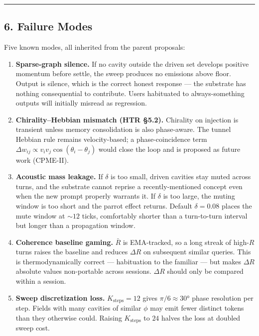 \documentclass[
  11pt,
  a4paper,
]{article}
\begin{document}
\begin{center}\rule{0.5\linewidth}{0.5pt}\end{center}

\subsection{6. Failure Modes}\label{failure-modes}

Five known modes, all inherited from the parent proposals:

\begin{enumerate}
\def\labelenumi{\arabic{enumi}.}
\item
  \textbf{Sparse-graph silence.} If no cavity outside the driven set
  develops positive momentum before settle, the sweep produces no
  emissions above floor. Output is silence, which is the correct honest
  response --- the substrate has nothing consequential to contribute.
  Users habituated to always-something outputs will initially misread as
  regression.
\item
  \textbf{Chirality--Hebbian mismatch (HTR §5.2).} Chirality on
  injection is transient unless memory consolidation is also
  phase-aware. The tunnel Hebbian rule remains velocity-based; a
  phase-coincidence term
  \(\Delta w_{ij} \propto v_i v_j \cos(\theta_i - \theta_j)\) would
  close the loop and is proposed as future work (CPME-II).
\item
  \textbf{Acoustic mass leakage.} If \(\delta\) is too small, driven
  cavities stay muted across turns, and the substrate cannot reprise a
  recently-mentioned concept even when the new prompt properly warrants
  it. If \(\delta\) is too large, the muting window is too short and the
  parrot effect returns. Default \(\delta = 0.08\) places the mute
  window at \(\sim 12\) ticks, comfortably shorter than a turn-to-turn
  interval but longer than a propagation window.
\item
  \textbf{Coherence baseline gaming.} \(\bar R\) is EMA-tracked, so a
  long streak of high-\(R\) turns raises the baseline and reduces
  \(\Delta R\) on subsequent similar queries. This is thermodynamically
  correct --- habituation to the familiar --- but makes \(\Delta R\)
  absolute values non-portable across sessions. \(\Delta R\) should only
  be compared within a session.
\item
  \textbf{Sweep discretization loss.} \(K_{\text{steps}} = 12\) gives
  \(\pi/6 \approx 30°\) phase resolution per step. Fields with many
  cavities of similar \(\phi\) may emit fewer distinct tokens than they
  otherwise could. Raising \(K_{\text{steps}}\) to \(24\) halves the
  loss at doubled sweep cost.
\end{enumerate}
\end{document}
